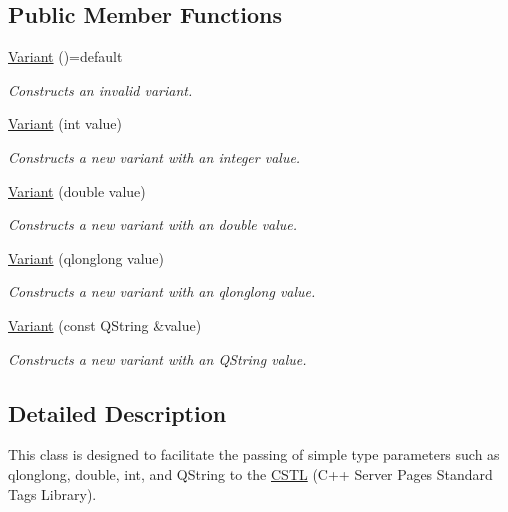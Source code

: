 \subsection*{Public Member Functions}
\begin{DoxyCompactItemize}
\item 
\hyperlink{class_variant_a594b84b7c7a7e997aac3354bbdaa2d97}{Variant} ()=default
\begin{DoxyCompactList}\small\item\em Constructs an invalid variant. \end{DoxyCompactList}\item 
\hyperlink{class_variant_a4bca2cf3c097e4fa9aea5c87c947e9a0}{Variant} (int value)
\begin{DoxyCompactList}\small\item\em Constructs a new variant with an integer value. \end{DoxyCompactList}\item 
\hyperlink{class_variant_a7e7d9a46e166e059ce75b76b92b11457}{Variant} (double value)
\begin{DoxyCompactList}\small\item\em Constructs a new variant with an double value. \end{DoxyCompactList}\item 
\hyperlink{class_variant_a6f86cea152e761f48700e41f210fe251}{Variant} (qlonglong value)
\begin{DoxyCompactList}\small\item\em Constructs a new variant with an qlonglong value. \end{DoxyCompactList}\item 
\hyperlink{class_variant_a2a2d8b7cc035142a795f86d481adde0c}{Variant} (const Q\+String \&value)
\begin{DoxyCompactList}\small\item\em Constructs a new variant with an Q\+String value. \end{DoxyCompactList}\end{DoxyCompactItemize}


\subsection{Detailed Description}
This class is designed to facilitate the passing of simple type parameters such as qlonglong, double, int, and Q\+String to the \hyperlink{namespace_c_s_t_l}{C\+S\+TL} (C++ Server Pages Standard Tags Library). 

